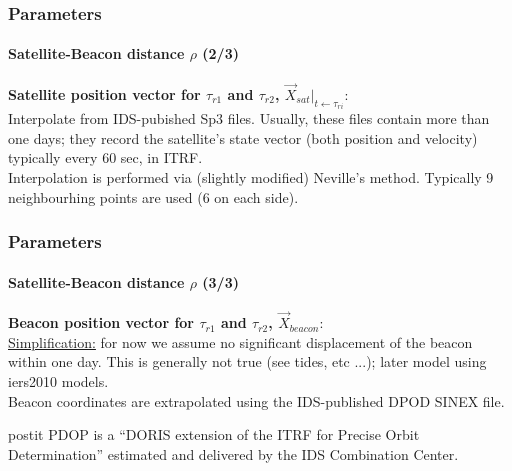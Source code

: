 \documentclass{beamer}
\begin{document}
\begin{frame}\frametitle{Parameters}\framesubtitle{Satellite-Beacon distance \(\rho\) (2/3)}
  \textbf{Satellite position vector for \(\tau_{r1}\) and \(\tau_{r2}\),  \(\vec{X}_{sat}|_{t \gets\tau_{ri}}\)}:\\
  \vspace{.2cm}
  Interpolate from IDS-pubished Sp3 files. Usually, these files contain more than one days; 
  they record the satellite's state vector (both position and velocity) typically every 
  60 sec, in ITRF.\\
  \vspace{.2cm}
  Interpolation is performed via (slightly modified) Neville's method. Typically 9 
  neighbourhing points are used (6 on each side).

\end{frame}

\begin{frame}\frametitle{Parameters}\framesubtitle{Satellite-Beacon distance \(\rho\) (3/3)}
  \textbf{Beacon position vector for \(\tau_{r1}\) and \(\tau_{r2}\),  \(\vec{X}_{beacon}\)}:\\
  \vspace{.2cm}
  \underline{Simplification:} for now we assume no significant displacement of the beacon 
  within one day. This is generally not true (see tides, etc ...); later model using iers2010 
  models.\\
  \vspace{.2cm}
  Beacon coordinates are extrapolated using the IDS-published DPOD SINEX file.\\
  \vspace{.1cm}
  \begin{beamercolorbox}[wd=\textwidth,rounded=true,shadow=true]{postit}
  PDOP is a “DORIS extension of the ITRF for Precise Orbit Determination”
  estimated and delivered by the IDS Combination Center.
  \end{beamercolorbox}

\end{frame}
\end{document}
